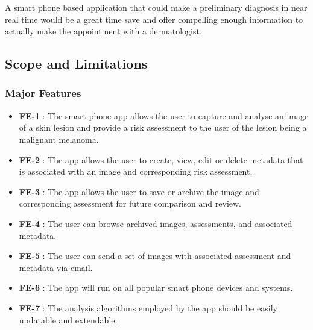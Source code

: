 A smart phone based application that could make a preliminary diagnosis in near real time would be a great time save and offer compelling enough information to actually make the appointment with a dermatologist.

    \subsection{Scope and Limitations}
    \subsubsection{Major Features}
        \noindent
        \begin{itemize}[leftmargin=*]
            \item[]  \textbf{FE-1} : The smart phone app allows the user to capture and analyse an image of a skin lesion and provide a risk assessment to the user of the lesion being a malignant melanoma.

            \item[] \textbf{FE-2} : The app allows the user to create, view, edit or delete metadata that is associated with an image and corresponding risk assessment.

            \item[] \textbf{FE-3} : The app allows the user to save or archive the image and corresponding assessment for future comparison and review.

            \item[] \textbf{FE-4} : The user can browse archived images, assessments, and associated metadata.

            \item[] \textbf{FE-5} : The user can send a set of images with associated assessment and metadata via email.

            \item[] \textbf{FE-6} : The app will run on all popular smart phone devices and systems.

            \item[] \textbf{FE-7} : The analysis algorithms employed by the app should be easily updatable and extendable.
        \end{itemize}

